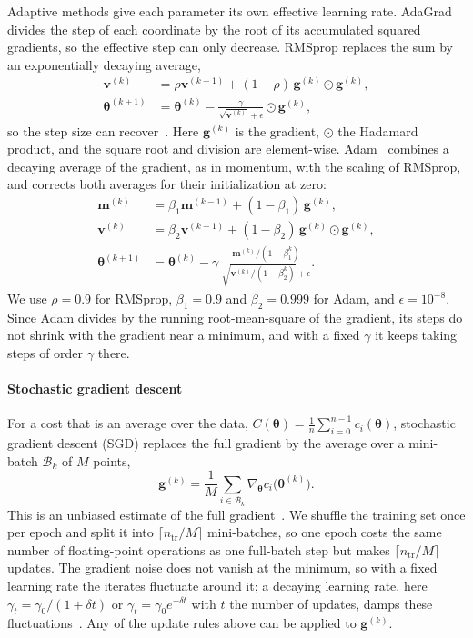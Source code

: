 Adaptive methods give each parameter its own effective learning rate. AdaGrad~\cite{duchi_2011}
divides the step of each coordinate by the root of its accumulated squared gradients,
so the effective step can only decrease. RMSprop replaces the sum by an exponentially
decaying average,
\begin{align}\label{eq:rmsprop-iterate}
    \bm{v}^{(k)} &= \rho\bm{v}^{(k-1)} + (1-\rho)\,\bm{g}^{(k)}\odot\bm{g}^{(k)},\nonumber \\
    \bm{\theta}^{(k+1)} &= \bm{\theta}^{(k)} - \frac{\gamma}{\sqrt{\bm{v}^{(k)}}
    + \epsilon}\odot\bm{g}^{(k)},
\end{align}
so the step size can recover~\cite{goodfellow_2016}. Here $\bm{g}^{(k)}$ is the gradient,
$\odot$ the Hadamard product, and the square root and division are element-wise.
Adam~\cite{kingma_2017} combines a decaying average of the gradient, as in momentum,
with the scaling of RMSprop, and corrects both averages for their initialization at zero:
\begin{align}\label{eq:adam-iterate}
    \bm{m}^{(k)} &= \beta_1\bm{m}^{(k-1)} + (1-\beta_1)\,\bm{g}^{(k)},\nonumber \\
    \bm{v}^{(k)} &= \beta_2\bm{v}^{(k-1)} + (1-\beta_2)\,\bm{g}^{(k)}\odot\bm{g}^{(k)},\nonumber \\
    \bm{\theta}^{(k+1)} &= \bm{\theta}^{(k)} - \gamma\,
    \frac{\bm{m}^{(k)}/(1-\beta_1^{k})}{\sqrt{\bm{v}^{(k)}/(1-\beta_2^{k})}+\epsilon}.
\end{align}
We use $\rho = 0.9$ for RMSprop, $\beta_1 = 0.9$ and $\beta_2 = 0.999$ for Adam, and
$\epsilon = 10^{-8}$. Since Adam divides by the running root-mean-square of the gradient,
its steps do not shrink with the gradient near a minimum, and with a fixed $\gamma$ it keeps
taking steps of order $\gamma$ there.

\paragraph{Stochastic gradient descent}

For a cost that is an average over the data, $C(\bm{\theta}) = \frac{1}{n}
\sum_{i=0}^{n-1} c_i(\bm{\theta})$, stochastic gradient descent (SGD) replaces the full
gradient by the average over a mini-batch $\mathcal{B}_k$ of $M$ points,
\begin{equation}
    \bm{g}^{(k)} = \frac{1}{M}\sum_{i\in\mathcal{B}_k}\nabla_{\bm{\theta}}
    c_i\big(\bm{\theta}^{(k)}\big).
\end{equation}
This is an unbiased estimate of the full gradient~\cite{goodfellow_2016}. We
shuffle the training set once per epoch and split it into $\lceil n_\text{tr}/M
\rceil$ mini-batches, so one epoch costs the same number of floating-point
operations as one full-batch step but makes $\lceil n_\text{tr}/M\rceil$
updates. The gradient noise does not vanish at the minimum, so with a fixed
learning rate the iterates fluctuate around it; a decaying learning rate,
here $\gamma_t = \gamma_0/(1+ \delta t)$ or $\gamma_t = \gamma_0 e^{-\delta t}$
with $t$ the number of updates, damps these fluctuations~\cite{hjorth-jensen_2026}.
Any of the update rules above can be applied to $\bm{g}^{(k)}$.


